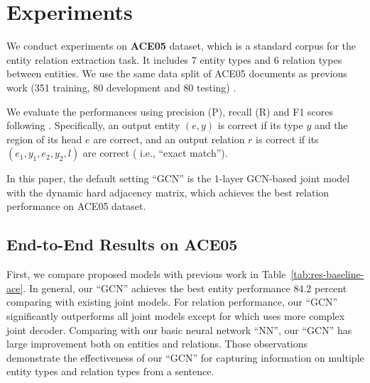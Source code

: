 \section{Experiments}
We conduct experiments on \textbf{ACE05} dataset,
which is a standard corpus for the entity relation extraction task.
It includes 7 entity types and 6 relation types between entities.
We use the same data split of ACE05 documents as previous work
(351 training, 80 development and 80 testing) \cite{miwa-bansal:2016:P16-1}.

We evaluate the performances using precision (P), recall
(R) and F1 scores following \cite{miwa-bansal:2016:P16-1,D18-1249}.
Specifically, an output entity $(e, y)$ is correct
if its type $y$ and the region of its head $e$ are correct, and an output
relation $r$ is correct if its $(e_1, y_1, e_2, y_2, l)$ are correct ( i.e., “exact match”).

In this paper, the default setting ``GCN'' is the 1-layer GCN-based joint model 
with the dynamic hard adjacency matrix, which achieves the best relation performance on ACE05 dataset.
\subsection{End-to-End Results on ACE05}



First, we compare proposed models with previous work in Table~\ref{tab:res-baseline-ace}.
In general,
our ``GCN''  achieves the best entity performance 84.2 percent
comparing with existing joint models.
For relation performance,
our ``GCN''  significantly outperforms all joint models 
except for \cite{D18-1249} which uses more complex joint decoder.
Comparing with our basic neural network ``NN'',
our ``GCN'' has large improvement both on entities and relations.
Those observations demonstrate the effectiveness of our ``GCN''  
for capturing information on multiple entity types and relation types from a sentence.

